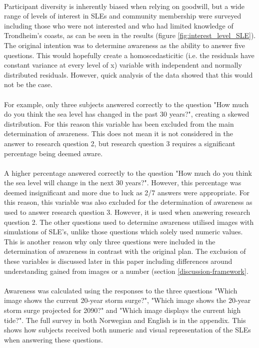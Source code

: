 \paragraph{}
Participant diversity is inherently biased when relying on goodwill, but a wide range of levels of interest in SLEs and community membership were surveyed including those who were not interested and who had limited knowledge of Trondheim’s coasts, as can be seen in the results (figure \ref{fig:interest_level_SLE}). The original intention was to determine awareness as the ability to answer five questions. This would hopefully create a homoscedasticitic (i.e. the residuals have constant variance at every level of x) variable with independent and normally distributed residuals. However, quick analysis of the data showed that this would not be the case.
\paragraph{}
For example, only three subjects answered correctly to the question "How much do you think the sea level has changed in the past 30 years?", creating a skewed distribution. For this reason this variable has been excluded from the main determination of awareness. This does not mean it is not considered in the answer to research question 2, but research question 3 requires a significant percentage being deemed aware. 
\paragraph{}
A higher percentage answered correctly to the question "How much do you think the sea level will change in the next 30 years?". However, this percentage was deemed insignificant and more due to luck as 2/7 answers were appropriate. For this reason, this variable was also excluded for the determination of awareness as used to answer research question 3. However, it is used when answering research question 2. The other questions used to determine awareness utilised images with simulations of SLE's, unlike those questions which solely used numeric values. This is another reason why only three questions were included in the determination of awareness in contrast with the original plan. The exclusion of these variables is discussed later in this paper including differences around understanding gained from images or a number (section \ref{discussion-framework}.
\paragraph{}
Awareness was calculated using the responses to the three questions "Which image shows the current 20-year storm surge?", "Which image shows the 20-year storm surge projected for 2090?" and "Which image displays the current high tide?". The full survey in both Norwegian and English is in the appendix. This shows how subjects received both numeric and visual representation of the SLEs when answering these questions. 



